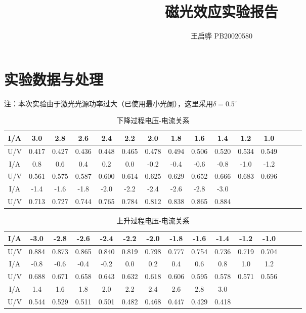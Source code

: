 \documentclass{article}
\title{\songti \zihao{2}\bfseries 磁光效应实验报告}
\author{王启骅 PB20020580}
\begin{document}
	\maketitle
\section{实验数据与处理}
注：本次实验由于激光光源功率过大（已使用最小光阑），这里采用$ \delta=0.5^{\circ} $

\begin{table}[!h]
	\centering
	\caption{\heiti{}下降过程电压-电流关系}
	\begin{tabular}{|c|c|c|c|c|c|c|c|c|c|c|c|c|c|c|}
		
		\hline
		I/A&3.0&2.8&2.6&2.4&2.2&2.0&1.8&1.6&1.4&1.2&1.0\\
		\hline
		U/V&0.417&0.427&0.436&0.448&0.465&0.478&0.494&0.506&0.520&0.534&0.549\\
		\hline
		I/A&0.8&0.6&0.4&0.2&0.0&-0.2&-0.4&-0.6&-0.8&-1.0&-1.2\\
		\hline
		U/V&0.561&0.575&0.587&0.600&0.614&0.625&0.629&0.652&0.666&0.683&0.696\\
		\hline
		I/A&-1.4&-1.6&-1.8&-2.0&-2.2&-2.4&-2.6&-2.8&-3.0&&\\
		\hline
		U/V&0.713&0.727&0.744&0.765&0.784&0.812&0.838&0.865&0.884&&\\
		\hline
	\end{tabular}
\end{table}
	\begin{table}[!h]
		\centering
		\caption{\heiti{}上升过程电压-电流关系}
		\begin{tabular}{|c|c|c|c|c|c|c|c|c|c|c|c|c|c|c|}
			
			\hline
			I/A&-3.0&-2.8&-2.6&-2.4&-2.2&-2.0&-1.8&-1.6&-1.4&-1.2&-1.0\\
			\hline
			U/V&0.884&0.873&0.865&0.840&0.819&0.798&0.777&0.754&0.736&0.719&0.704\\
			\hline
			I/A&-0.8&-0.6&-0.4&-0.2&0.0&0.2&0.4&0.6&0.8&1.0&1.2\\
			\hline
			U/V&0.688&0.671&0.658&0.643&0.632&0.618&0.606&0.595&0.578&0.571&0.556\\
			\hline
			I/A&1.4&1.6&1.8&2.0&2.2&2.4&2.6&2.8&3.0&&\\
			\hline
			U/V&0.544&0.529&0.511&0.501&0.482&0.468&0.447&0.429&0.418&&\\
			\hline
		\end{tabular}
	\end{table}
\end{document}
